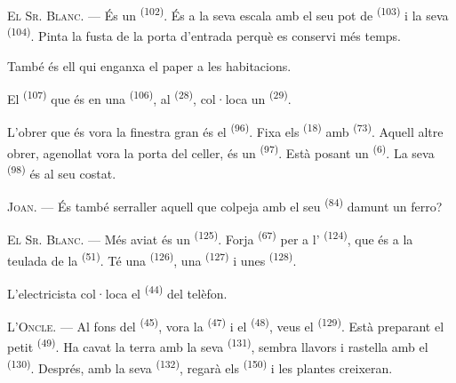 \textsc{El Sr. Blanc}. --- És un  \textsuperscript{(102)}. És a la seva escala
amb el seu pot de  \textsuperscript{(103)} i la seva
 \textsuperscript{(104)}. Pinta la fusta de la porta d'entrada
perquè es conservi més temps.

També és ell qui enganxa el paper a les habitacions.

El  \textsuperscript{(107)} que és en una 
\textsuperscript{(106)}, al  \textsuperscript{(28)}, col·loca un
 \textsuperscript{(29)}.

L'obrer que és vora la finestra gran és el  \textsuperscript{(96)}. Fixa els
 \textsuperscript{(18)} amb
 \textsuperscript{(73)}. Aquell altre obrer, agenollat vora la
porta del celler, és un  \textsuperscript{(97)}. Està posant un
 \textsuperscript{(6)}. La seva  \textsuperscript{(98)}
és al seu costat.

\textsc{Joan}. --- És també serraller aquell que colpeja amb el seu
 \textsuperscript{(84)} damunt un ferro?

\textsc{El Sr. Blanc}. --- Més aviat és un  \textsuperscript{(125)}. Forja
 \textsuperscript{(67)} per a l' \textsuperscript{(124)},
que és a la teulada de la
 \textsuperscript{(51)}. Té una 
\textsuperscript{(126)}, una  \textsuperscript{(127)} i unes
 \textsuperscript{(128)}.

L'electricista col·loca el  \textsuperscript{(44)} del telèfon.

\VUsaut{3.0mm}

\textsc{L'Oncle}. --- Al fons del  \textsuperscript{(45)}, vora la
 \textsuperscript{(47)} i el 
\textsuperscript{(48)}, veus el  \textsuperscript{(129)}. Està preparant el
petit  \textsuperscript{(49)}. Ha cavat la terra amb la seva 
\textsuperscript{(131)}, sembra llavors i rastella amb el
 \textsuperscript{(130)}. Després, amb la seva 
\textsuperscript{(132)}, regarà els  \textsuperscript{(150)} i les plantes
creixeran.

